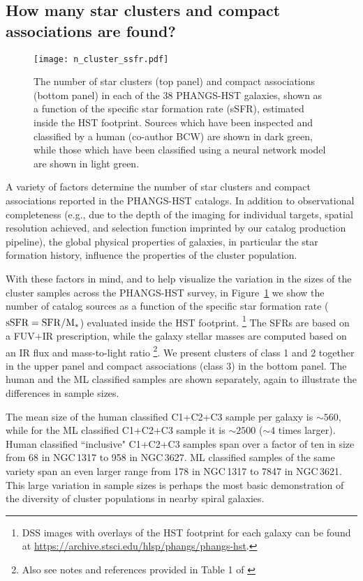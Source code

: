 \documentclass[]{aastex631}
\begin{document}
\subsection{How many star clusters and compact associations are found?}\label{ssect:how_many_clusters}
%
\begin{figure}
\texttt{[image: n\_cluster\_ssfr.pdf]}
 \caption{The number of star clusters (top panel) and compact associations (bottom panel) in each of the 38 PHANGS-HST galaxies, shown as a function of the specific star formation rate (sSFR), estimated inside the HST footprint. Sources which have been inspected and classified by a human (co-author BCW) are shown in dark green, while those which have been classified using a neural network model \citep{hannon_star_2023} are shown in light green.}
 \label{fig:n_cluster_ssfr}
\end{figure}
% 

A variety of factors determine the number of star clusters and compact associations reported in the PHANGS-HST catalogs.
In addition to observational completeness (e.g., due to the depth of the imaging for individual targets, spatial resolution achieved, and selection function imprinted by our catalog production pipeline), the global physical properties of galaxies, in particular the star formation history, influence the properties of the cluster population. 

With these factors in mind, and to help visualize the variation in the sizes of the cluster samples across the PHANGS-HST survey, in Figure~\ref{fig:n_cluster_ssfr} we show the number of catalog sources as a function of the specific star formation rate (${\rm sSFR = SFR / M_{*}}$) evaluated inside the HST footprint. \footnote{DSS images with overlays of the HST footprint for each galaxy can be found at \url{https://archive.stsci.edu/hlsp/phangs/phangs-hst}.}  
The SFRs are based on a FUV$+$IR prescription, while the galaxy stellar masses are computed based on an IR flux and mass-to-light ratio \citep{leroy_z_2019,leroy_phangs-alma_2021}\footnote{Also see notes and references provided in Table 1 of \citet{lee_phangs-hst_2022}}.  We present clusters of class 1 and 2 together in the upper panel and compact associations (class 3) in the bottom panel. The human and the ML classified samples are shown separately, again to illustrate the differences in sample sizes. 


The mean size of the human classified C1+C2+C3 sample per galaxy is $\sim560$, while for the ML classified C1+C2+C3 sample it is $\sim2500$ ($\sim4$ times larger).  Human classified ``inclusive" C1+C2+C3 samples span over a factor of ten in size from 68 in NGC\,1317 to 958 in NGC\,3627.  ML classified samples of the same variety span an even larger range from  178 in NGC\,1317 to 7847 in NGC\,3621.  This large variation in sample sizes is perhaps the most basic demonstration of the diversity of cluster populations in nearby spiral galaxies.
\end{document}
